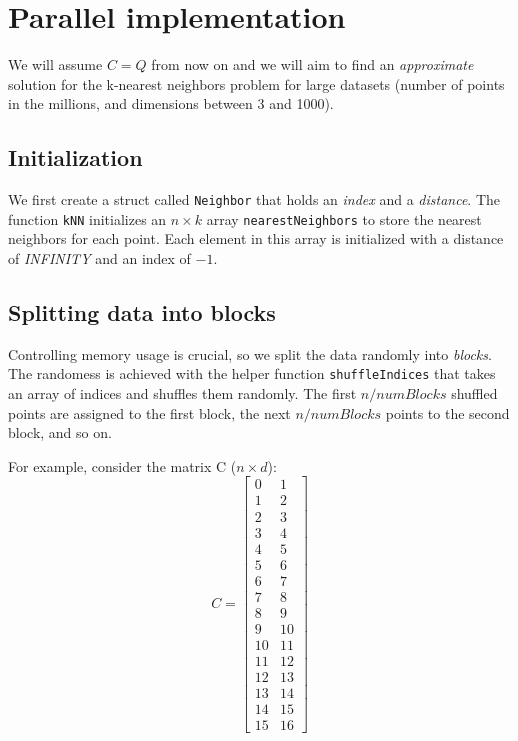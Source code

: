 \documentclass{article}
\begin{document}
\section{Parallel implementation}
We will assume $C=Q$ from now on and we will aim to find an \emph{approximate} solution for the k-nearest neighbors problem
for large datasets (number of points in the millions, and dimensions between 3 and 1000).


\subsection{Initialization}
We first create a struct called \texttt{Neighbor} that holds an \emph{index} and a \emph{distance}.
The function \texttt{kNN} initializes an $n \times k$ array \texttt{nearestNeighbors} to store the nearest neighbors for each point.
Each element in this array is initialized with a distance of \emph{INFINITY} and an index of $-1$.

\subsection{Splitting data into blocks}
Controlling memory usage is crucial, so we split the data randomly into \emph{blocks}. The randomess is achieved with the helper 
function \texttt{shuffleIndices} that takes an array of indices and shuffles them randomly. The first $n / numBlocks$ shuffled
points are assigned to the first block, the next $n / numBlocks$ points to the second block, and so on.

For example, consider the matrix C ($n \times d$):
\[
C = \begin{bmatrix}
0 & 1 \\
1 & 2 \\
2 & 3 \\
3 & 4 \\
4 & 5 \\
5 & 6 \\
6 & 7 \\
7 & 8 \\
8 & 9 \\
9 & 10 \\
10 & 11 \\
11 & 12 \\
12 & 13 \\
13 & 14 \\
14 & 15 \\
15 & 16
\end{bmatrix}
\]
\end{document}
